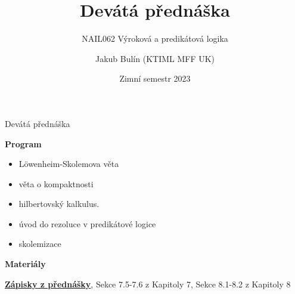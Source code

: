 \documentclass{beamer}
\title{Devátá přednáška}
\subtitle{NAIL062 Výroková a predikátová logika}
\author{Jakub Bulín (KTIML MFF UK)}
\date{Zimní semestr 2023}
\begin{document}
\frame{\titlepage}


\begin{frame}{Devátá přednáška}

    \textbf{Program}
        \begin{itemize}
            \item Löwenheim-Skolemova věta
            \item věta o kompaktnosti
            \item hilbertovský kalkulus.
            \item úvod do rezoluce v predikátové logice
            \item skolemizace
        \end{itemize}

    \textbf{Materiály}

        \href{https://github.com/jbulin-mff-uk/nail062/raw/main/lecture/lecture-notes/lecture-notes.pdf}{\alert{\textbf{Zápisky z přednášky}}}, Sekce 7.5-7.6 z Kapitoly 7, Sekce 8.1-8.2 z Kapitoly 8

\end{frame}
\end{document}
